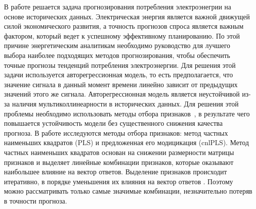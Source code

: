 \documentclass[12pt,twoside]{article}
\begin{document}

В работе решается задача прогнозирования потребления электроэнегрии на основе исторических данных. Электрическая энергия является важной движущей силой экономического развития, а точность прогнозов спроса является важным фактором, который ведет к успешному эффективному планированию. По этой причине энергетическим аналитикам необходимо руководство для лучшего выбора наиболее подходящих методов прогнозирования, чтобы обеспечить точные прогнозы тенденций потребления электроэнергии. Для решения этой задачи используется авторегрессионная модель, то есть предполагается, что значение сигнала в данный момент времени линейно зависит от предыдущих значений этого же сигнала. Авторегрессионная модель является неустойчивой из-за наличия мультиколлинеарности в исторических данных. Для решения этой проблемы необходимо использовать методы отбора признаков~\cite{Adolph}, в результате чего повышается устойчивость модели без существенного снижения качества прогноза.
В работе исследуются методы отбора признаков: метод частных наименьших квадратов (PLS) \cite{Ng2013} и предложенная его модицикация (cnlPLS).
Метод частных наименьших квадратов основан на снижении размерности матрицы признаков и выделяет линейные комбинации признаков, которые оказывают наибольшее влияние на вектор ответов. Выделение признаков происходит итеративно, в порядке уменьшения их влияния на вектор ответов \cite{Ng2013}. Поэтому можно рассматривать только самые значимые комбинации, незначительно потеряв в точности прогноза. 
\end{document}
